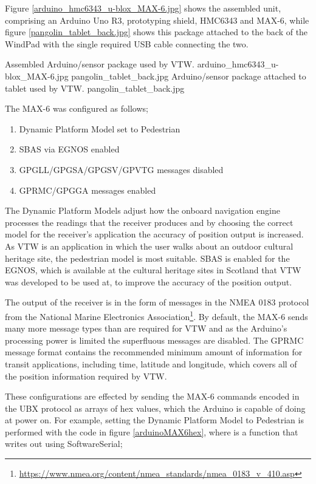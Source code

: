 Figure \ref{arduino_hmc6343_u-blox_MAX-6.jpg} shows the assembled unit, comprising an Arduino Uno R3, prototyping shield, HMC6343 and MAX-6, while figure \ref{pangolin_tablet_back.jpg} shows this package attached to the back of the WindPad with the single required USB cable connecting the two.

 {Assembled Arduino/sensor package used by VTW.} {arduino_hmc6343_u-blox_MAX-6.jpg}
       {pangolin_tablet_back.jpg} {Arduino/sensor package attached to tablet used by VTW.} {pangolin_tablet_back.jpg}
       

The MAX-6 was configured as follows;

\begin{enumerate}
	\item Dynamic Platform Model set to Pedestrian
	\item SBAS via EGNOS enabled
	\item GPGLL/GPGSA/GPGSV/GPVTG messages disabled
	\item GPRMC/GPGGA messages enabled
\end{enumerate}

The Dynamic Platform Models adjust how the onboard navigation engine processes the readings that the receiver produces and by choosing the correct model for the receiver's application the accuracy of position output is increased. As VTW is an application in which the user walks about an outdoor cultural heritage site, the pedestrian model is most suitable. SBAS is enabled for the EGNOS, which is available at the cultural heritage sites in Scotland that VTW was developed to be used at, to improve the accuracy of the position output.

The output of the receiver is in the form of messages in the NMEA 0183 protocol from the National Marine Electronics Association\footnote{\url{https://www.nmea.org/content/nmea_standards/nmea_0183_v_410.asp}}. By default, the MAX-6 sends many more message types than are required for VTW and as the Arduino's processing power is limited the superfluous messages are disabled. The GPRMC message format contains the recommended minimum amount of information for transit applications, including time, latitude and longitude, which covers all of the position information required by VTW.

These configurations are effected by sending the MAX-6 commands encoded in the UBX protocol as arrays of hex values, which the Arduino is capable of doing at power on. For example, setting the Dynamic Platform Model to Pedestrian is performed with the code in figure \ref{arduinoMAX6hex}, where  is a function that writes out using SoftwareSerial;

